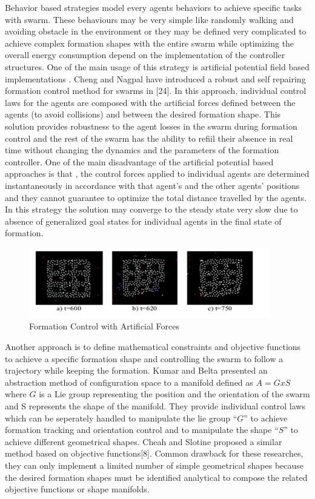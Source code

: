 \documentclass[twoside]{article}
\begin{document}
Behavior based strategies model every agents behaviors to achieve specific tasks with swarm. These behaviours may be very simple like randomly walking and avoiding obstacle in the environment or they may be defined very complicated to achieve complex formation shapes with the entire swarm while optimizing the overall energy consumption depend on the implementation of the controller structures.  One of the main usage of this strategy is artificial potential field based implementations . Cheng and Nagpal have introduced a robust and self repairing formation control method for swarms in [24]. In this approach, individual control laws for the agents are composed with the artificial forces defined between the agents (to avoid collisions) and between the desired formation shape. This solution provides robustness to the agent losses in the swarm during formation control and the rest of the swarm has the ability to refiil their absence in real time without changing the dynamics and the parameters of the formation controller. One of the main disadvantage of the artificial potential based approaches is that , the control forces applied to individual agents are determined instantaneously in accordance with that agent's and the other agents' positions and they cannot guarantee to optimize the total distance travelled by the agents. In this strategy the solution may converge to the steady state very slow due to absence of generalized goal states for individual agents in the final state of formation. 

\begin{figure}[H]
	\caption{Formation Control with Artificial Forces}
	\centering
	\includegraphics[scale = 1]{potential}
\end{figure}


Another approach is to define mathematical constraints and objective functions to achieve a specific formation shape and controlling the swarm to follow a trajectory while keeping the formation.  Kumar and Belta presented an abstraction method of configuration space to a manifold defined as $A  = G x S$ where $G$ is a Lie group representing the position and the orientation of the swarm  and S represents the shape of the manifold.  They provide individual control laws which can be seperately handled to manipulate the lie group $“G”$ to achieve formation tracking and orientation control and to manipulate the shape $“S”$ to achieve different geometrical shapes. Cheah and Slotine proposed a similar method based on objective functions[8].  Common drawback for these researches, they can only implement a limited number of simple geometrical shapes because the desired formation shapes must be identified analytical to compose the related objective functions or shape manifolds. 
\end{document}
